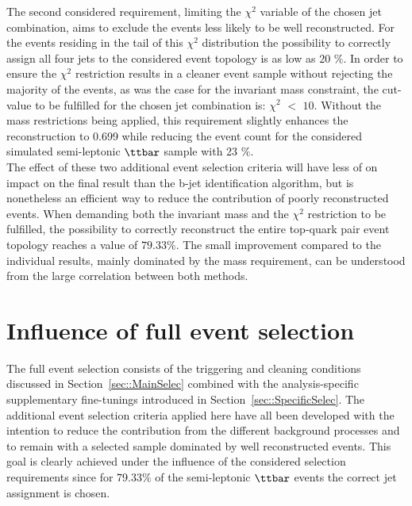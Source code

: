The second considered requirement, limiting the $\chi^{2}$ variable of the chosen jet combination, aims to exclude the events less likely to be well reconstructed.
For the events residing in the tail of this $\chi^{2}$ distribution the possibility to correctly assign all four jets to the considered event topology is as low as 20 $\%$.
In order to ensure the $\chi^{2}$ restriction results in a cleaner event sample without rejecting the majority of the events, as was the case for the invariant mass constraint, the cut-value to be fulfilled for the chosen jet combination is: $\chi^{2}$ $<$ $10$.
Without the mass restrictions being applied, this requirement slightly enhances the reconstruction to 0.699 while reducing the event count for the considered simulated semi-leptonic $\ttbar$ sample with 23 $\%$.
\\

The effect of these two additional event selection criteria will have less of on impact on the final result than the b-jet identification algorithm, but is nonetheless an efficient way to reduce the contribution of poorly reconstructed events.
When demanding both the invariant mass and the $\chi^{2}$ restriction to be fulfilled, the possibility to correctly reconstruct the entire top-quark pair event topology reaches a value of $79.33\%$.
The small improvement compared to the individual results, mainly dominated by the mass requirement, can be understood from the large correlation between both methods.

\section{Influence of full event selection} %
The full event selection consists of the triggering and cleaning conditions discussed in Section~\ref{sec::MainSelec} combined with the analysis-specific supplementary fine-tunings introduced in Section~\ref{sec::SpecificSelec}.
The additional event selection criteria applied here have all been developed with the intention to reduce the contribution from the different background processes and to remain with a selected sample dominated by well reconstructed events.
This goal is clearly achieved under the influence of the considered selection requirements
since for 79.33$\%$ of the semi-leptonic $\ttbar$ events the correct jet assignment is chosen.
\\

